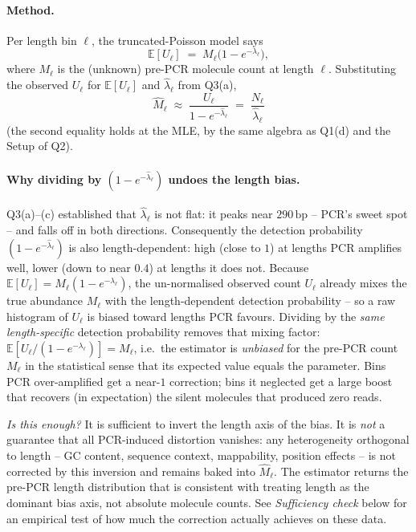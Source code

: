\documentclass[11pt,a4paper]{article}
\newcommand{\E}{\mathbb{E}}
\newcommand{\hlam}{\hat{\lambda}}
\newcommand{\hM}{\hat{M}}
\begin{document}
\paragraph{Method.}
Per length bin $\ell$, the truncated-Poisson model says
\[
   \E[U_\ell] \;=\; M_\ell \bigl(1 - e^{-\lambda_\ell}\bigr),
\]
where $M_\ell$ is the (unknown) pre-PCR molecule count at length $\ell$.
Substituting the observed $U_\ell$ for $\E[U_\ell]$ and $\hlam_\ell$ from Q3(a),
\[
   \hM_\ell \;\approx\; \frac{U_\ell}{1 - e^{-\hlam_\ell}} \;=\; \frac{N_\ell}{\hlam_\ell}
\]
(the second equality holds at the MLE, by the same algebra as Q1(d) and the
Setup of Q2).

\paragraph{Why dividing by $(1-e^{-\hlam_\ell})$ undoes the length bias.}
Q3(a)--(c) established that $\hlam_\ell$ is not flat: it peaks near
$290\,\text{bp}$ -- PCR's sweet spot -- and falls off in both directions.
Consequently the detection probability $(1 - e^{-\hlam_\ell})$ is also
length-dependent: high (close to $1$) at lengths PCR amplifies well, lower (down
to near $0.4$) at lengths it does not. Because $\E[U_\ell] = M_\ell (1 -
e^{-\lambda_\ell})$, the un-normalised observed count $U_\ell$ already mixes the
true abundance $M_\ell$ with the length-dependent detection probability -- so a
raw histogram of $U_\ell$ is biased toward lengths PCR favours. Dividing by the
\emph{same length-specific} detection probability removes that mixing factor:
$\E[U_\ell / (1 - e^{-\lambda_\ell})] = M_\ell$, i.e.\ the estimator is
\emph{unbiased} for the pre-PCR count $M_\ell$ in the statistical sense that its
expected value equals the parameter. Bins PCR over-amplified get a near-$1$
correction; bins it neglected get a large boost that recovers (in expectation)
the silent molecules that produced zero reads.

\emph{Is this enough?} It is sufficient to invert the length axis of the bias.
It is \emph{not} a guarantee that all PCR-induced distortion vanishes: any
heterogeneity orthogonal to length -- GC content, sequence context, mappability,
position effects -- is not corrected by this inversion and remains baked into
$\hM_\ell$. The estimator returns the pre-PCR length distribution that is
consistent with treating length as the dominant bias axis, not absolute molecule
counts. See \emph{Sufficiency check} below for an empirical test of how much
the correction actually achieves on these data.
\end{document}
